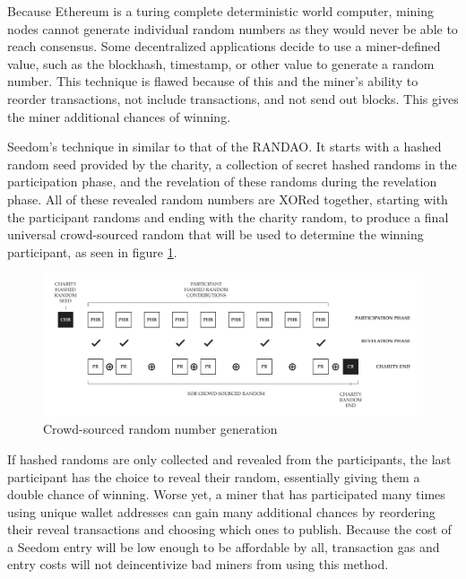 \documentclass[11pt]{article}
\begin{document}
Because Ethereum is a turing complete deterministic world computer, mining nodes cannot generate individual random numbers as they would never be able to reach consensus. Some decentralized applications decide to use a miner-defined value, such as the blockhash, timestamp, or other value to generate a random number. This technique is flawed because of this and the miner's ability to reorder transactions, not include transactions, and not send out blocks. This gives the miner additional chances of winning.

Seedom's technique in similar to that of the RANDAO\cite{2}. It starts with a hashed random seed provided by the charity, a collection of secret hashed randoms in the participation phase, and the revelation of these randoms during the revelation phase. All of these revealed random numbers are XORed together, starting with the participant randoms and ending with the charity random, to produce a final universal crowd-sourced random that will be used to determine the winning participant, as seen in figure \ref{figure:crowdsourcedRandomNumberGeneration}.

\begin{figure}[H]
\begin{center}
\includegraphics[width=1.0\textwidth]{crowdsourcedRandomNumberGeneration.pdf}
\caption{Crowd-sourced random number generation}
\label{figure:crowdsourcedRandomNumberGeneration}
\end{center}
\end{figure}

If hashed randoms are only collected and revealed from the participants, the last participant has the choice to reveal their random, essentially giving them a double chance of winning. Worse yet, a miner that has participated many times using unique wallet addresses can gain many additional chances by reordering their reveal transactions and choosing which ones to publish. Because the cost of a Seedom entry will be low enough to be affordable by all, transaction gas and entry costs will not deincentivize bad miners from using this method.
\end{document}
